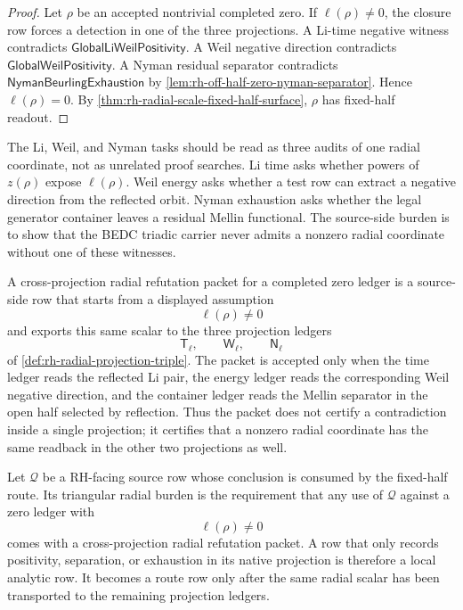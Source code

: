 \begin{proof}
Let $\rho$ be an accepted nontrivial completed zero.  If
$\ell(\rho)\ne0$, the closure row forces a detection in one of the
three projections.  A Li-time negative witness contradicts
$\mathsf{GlobalLiWeilPositivity}$.  A Weil negative direction
contradicts $\mathsf{GlobalWeilPositivity}$.  A Nyman residual separator
contradicts $\mathsf{NymanBeurlingExhaustion}$ by
\autoref{lem:rh-off-half-zero-nyman-separator}.  Hence
$\ell(\rho)=0$.  By
\autoref{thm:rh-radial-scale-fixed-half-surface}, $\rho$ has fixed-half
readout.
\end{proof}

\begin{principle}
\label{prin:rh-single-radial-burden}
The Li, Weil, and Nyman tasks should be read as three audits of one
radial coordinate, not as unrelated proof searches.  Li time asks
whether powers of $z(\rho)$ expose $\ell(\rho)$.  Weil energy asks
whether a test row can extract a negative direction from the reflected
orbit.  Nyman exhaustion asks whether the legal generator container
leaves a residual Mellin functional.  The source-side burden is to show
that the BEDC triadic carrier never admits a nonzero radial coordinate
without one of these witnesses.
\end{principle}

\begin{definition}
\label{def:rh-cross-projection-radial-refutation-packet}
A cross-projection radial refutation packet for a completed zero ledger
is a source-side row that starts from a displayed assumption
$$
\ell(\rho)\ne0
$$
and exports this same scalar to the three projection ledgers
$$
\mathsf T_{\ell},
\qquad
\mathsf W_{\ell},
\qquad
\mathsf N_{\ell}
$$
of \autoref{def:rh-radial-projection-triple}.  The packet is accepted
only when the time ledger reads the reflected Li pair, the energy ledger
reads the corresponding Weil negative direction, and the container
ledger reads the Mellin separator in the open half selected by
reflection.  Thus the packet does not certify a contradiction inside a
single projection; it certifies that a nonzero radial coordinate has
the same readback in the other two projections as well.
\end{definition}

\begin{definition}
\label{def:rh-triangular-burden-radial-source-row}
Let $\mathcal Q$ be a RH-facing source row whose conclusion is consumed
by the fixed-half route.  Its triangular radial burden is the
requirement that any use of $\mathcal Q$ against a zero ledger with
$$
\ell(\rho)\ne0
$$
comes with a cross-projection radial refutation packet.  A row that
only records positivity, separation, or exhaustion in its native
projection is therefore a local analytic row.  It becomes a route row
only after the same radial scalar has been transported to the remaining
projection ledgers.
\end{definition}

